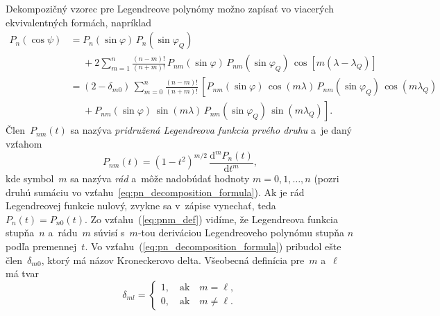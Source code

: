 \documentclass[a4paper, 12pt]{book}
\newcommand{\diff}{\mathrm d}
\begin{document}
Dekompozičný vzorec pre Legendreove polynómy možno zapísať vo viacerých
ekvivalentných formách, napríklad
\parencite{Hobson,MoritzPhysicalGeodesy,SansoGeoidDetermination}
%
\begin{equation}
\label{eq:pn_decomposition_formula}
\begin{split}
P_n(\cos\psi) &= P_n(\sin\varphi) \, P_n(\sin\varphi_Q)\\
%
&\phantom{={}} +2 \sum_{m = 1}^{n} \frac{(n - m)!}{(n + m)!} \,
P_{nm}(\sin\varphi) \, P_{nm}(\sin\varphi_Q) \, \cos\left[m (\lambda
- \lambda_Q) \right]\\
%
&= (2 - \delta_{m0}) \, \sum_{m = 0}^{n} \frac{(n - m)!}{(n + m)!} \, \left[
P_{nm}(\sin\varphi) \, \cos(m\lambda) \, P_{nm}(\sin\varphi_Q) \,
\cos(m\lambda_Q)\right.\\
%
&\phantom{={}}+\left. P_{nm}(\sin\varphi) \, \sin(m\lambda) \,
P_{nm}(\sin\varphi_Q) \, \sin(m\lambda_Q)\right]{.}
\end{split}
\end{equation}
%
Člen~$P_{nm}(t)$ sa nazýva \emph{pridružená Legendreova funkcia prvého druhu}
a~je daný vzťahom
%
\begin{equation}
\label{eq:pnm_def}
P_{nm}(t) = (1 - t^2)^{m \slash 2} \, \frac{\diff^m P_n(t)}{\diff t^m}{,}
\end{equation}
%
kde symbol~$m$ sa nazýva \emph{rád} a~môže nadobúdať hodnoty $m = 0, 1, \dots, 
n$ (pozri druhú sumáciu vo vzťahu~\ref{eq:pn_decomposition_formula}).  Ak je 
rád Legendreovej funkcie nulový, zvykne sa v~zápise vynechať, teda $P_n(t) 
= P_{n0}(t)$.  Zo vzťahu~(\ref{eq:pnm_def}) vidíme, že Legendreova funkcia 
stupňa~$n$ a~rádu~$m$ súvisí s~$m$-tou deriváciou Legendreoveho polynómu stupňa 
$n$ podľa premennej~$t$.  Vo vzťahu~(\ref{eq:pn_decomposition_formula}) 
pribudol ešte člen~$\delta_{m0}$, ktorý má názov Kroneckerovo delta.  Všeobecná 
definícia pre~$m$ a~$\ell$ má tvar
%
\begin{equation}
\delta_{ml} =
%
\begin{cases}
1{,} \quad \mathrm{ak} \quad m = \ell{,}\\
0{,} \quad \mathrm{ak} \quad m \neq \ell{.}
\end{cases}
\end{equation}
\end{document}
